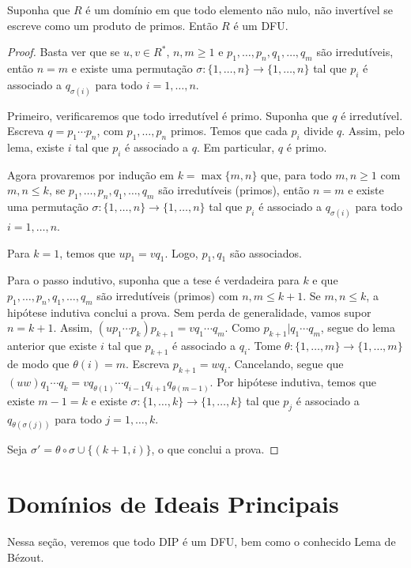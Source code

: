 \begin{prop}
Suponha que $R$ é um domínio em que todo elemento não nulo, não invertível se escreve como um produto de primos.
Então $R$ é um DFU.
\end{prop}
\begin{proof}
    Basta ver que se $u, v \in R^*$, $n, m\geq 1$ e $p_1, \dots, p_n, q_1, \dots, q_m$ são irredutíveis, então $n=m$ e existe uma permutação $\sigma:\{1, \dots, n\}\rightarrow \{1, \dots, n\}$ tal que $p_i$ é associado a $q_{\sigma(i)}$ para todo $i=1, \dots, n$.

    Primeiro, verificaremos que todo irredutível é primo.
    Suponha que $q$ é irredutível.
    Escreva $q=p_1\cdots p_n$, com $p_1, \dots, p_n$ primos.
    Temos que cada $p_i$ divide $q$.
    Assim, pelo lema, existe $i$ tal que $p_i$ é associado a $q$.
    Em particular, $q$ é primo.

    Agora provaremos por indução em $k=\max\{m, n\}$ que, para todo $m, n\geq1$ com $m, n\leq k$, se $p_1, \dots, p_n, q_1, \dots, q_m$ são irredutíveis (primos), então $n=m$ e existe uma permutação $\sigma:\{1, \dots, n\}\rightarrow \{1, \dots, n\}$ tal que $p_i$ é associado a $q_{\sigma(i)}$ para todo $i=1, \dots, n$.

    Para $k=1$, temos que $u p_1= v q_1$.
    Logo, $p_1, q_1$ são associados.

    Para o passo indutivo, suponha que a tese é verdadeira para $k$ e que $p_1, \dots, p_n, q_1, \dots, q_m$ são irredutíveis (primos) com $n, m\leq k+1$.
    Se $m, n\leq k$, a hipótese indutiva conclui a prova.
    Sem perda de generalidade, vamos supor $n=k+1$.
    Assim, $(up_1\cdots p_{k})p_{k+1}=vq_1\cdots q_{m}$.
    Como $p_{k+1}|q_1\cdots q_m$, segue do lema anterior que existe $i$ tal que $p_{k+1}$ é associado a $q_i$.
    Tome $\theta: \{1, \dots, m\}\rightarrow \{1, \dots, m\}$ de modo que  $\theta(i)=m$. Escreva $p_{k+1}=w q_i$.
    Cancelando, segue que $(uw)q_1\cdots q_k = vq_{\theta(1)}\cdots q_{i-1}q_{i+1} q_{\theta(m-1)}$.
    Por hipótese indutiva, temos que existe $m-1=k$ e existe $\sigma: \{1, \dots, k\}\rightarrow \{1, \dots, k\}$ tal que $p_j$ é associado a $q_{\theta(\sigma(j))}$ para todo $j=1, \dots, k$.

    Seja $\sigma'=\theta\circ\sigma \cup \{(k+1, i)\}$, o que conclui a prova.
\end{proof}

\section{Domínios de Ideais Principais}
Nessa seção, veremos que todo DIP é um DFU, bem como o conhecido Lema de Bézout.


